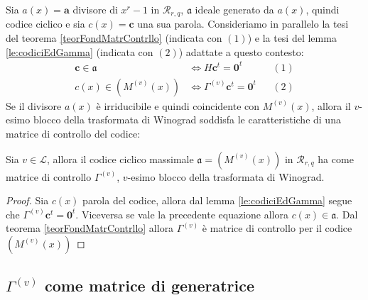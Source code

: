 Sia $a(x)=\mathbf{a}$ divisore di $x^{r} - 1$ in $\mathcal{R}_{r,q} $, $\mathfrak{a}$ ideale generato da $a(x)$, quindi codice ciclico e sia $c(x) = \mathbf{c}$ una sua parola. Consideriamo in parallelo la tesi del teorema \ref{teorFondMatrContrllo} (indicata con $(1)$) e la tesi del lemma \ref{le:codiciEdGamma} (indicata con $(2)$) adattate a questo contesto:
\begin{align*}
  \mathbf{c} \in \mathfrak{a} &\iff H \mathbf{c}^{t} = \mathbf{0}^{t}  & & (1) \\
  c(x) \in (M^{(v)}(x)) &\iff \Gamma^{(v)} \mathbf{c}^{t} = \mathbf{0}^{t} & & (2)
\end{align*}
Se il divisore $a(x)$ è irriducibile e quindi coincidente con $M^{(v)}(x)$, allora il $v$-esimo blocco della trasformata di Winograd soddisfa le caratteristiche di una matrice di controllo del codice:
\begin{teorema}
   Sia $v \in \mathscr{L}$, allora il codice ciclico massimale $\mathfrak{a} = (M^{(v)}(x))$ in $\mathcal{R}_{r,q}$ ha come matrice di controllo $\Gamma^{(v)} $, $v$-esimo blocco della trasformata di Winograd. 
\end{teorema}
\begin{proof}
   Sia $c(x)$ parola del codice, allora dal lemma \ref{le:codiciEdGamma} segue che $\Gamma^{(v)} \mathbf{c}^{t} = \mathbf{0}^{t}$. Viceversa se vale la precedente equazione allora $c(x) \in \mathfrak{a}$. Dal teorema \ref{teorFondMatrContrllo} allora $\Gamma^{(v)}$ è matrice di controllo per il codice $(M^{(v)}(x))$
\end{proof}

\subsection{$\Gamma^{(v)}$ come matrice di generatrice}

